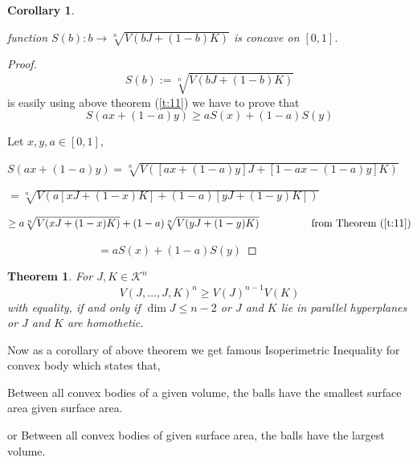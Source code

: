 \documentclass[oneside]{book}
\newtheorem{theorem}{Theorem}[section]
\newtheorem{corollary}{Corollary}[section]
\begin{document}
	\begin{corollary}
		\label{cor:2}
		
		function $ S(b):b\rightarrow \sqrt[n]{V(bJ+(1-b)K)}$  is concave on $[0,1] .$ 
	\end{corollary}
	\begin{proof}
		
		\[
		S(b):=\sqrt[n]{V(b J+(1-b) K)}
		\] 
		is  easily using above theorem (\ref{t:11})
		\hfill \break
		we have to prove that 
		$$ S(a x+(1-a) y) \geq a S(x)+(1-a) S(y) $$
		
		Let $x, y, a \in[0,1],$ 
		
		\hfill \break
		
		$  S(ax+(1-a)y)  =\sqrt[n]{V([ax+(1-a)y] J+[1-a x-(1-a) y] K)}$
		
		\hfill \break
		
		\quad \quad \quad \quad \quad \quad \quad \quad 
		$=\sqrt[n]{V(a[x J+(1-x) K]+(1-a)[y J+(1-y) K])}$
		
		\hfill \break
		
		\quad \quad \quad \quad \quad \quad \quad \quad   $
		\geq a \sqrt[n]{V(x J+(1-x) K)}+(1-a) \sqrt[n]{V(y J+(1-y) K)}
		\quad \quad \quad \quad \quad \text{from Theorem } (\ref{t:11})$
		
		\hfill \break
		
		$ \quad \quad \quad \quad \quad  \quad  \quad \quad = a S(x)+(1-a) S(y)$
	\end{proof}
	
	
	
	
	
	
	
	
	
	
	
	
	
	
	\begin{theorem}
		\label{t:12}
		For $J, K \in \mathcal{K}^{n}$
		\[
		V(J, \ldots, J, K)^{n} \geq V(J)^{n-1} V(K)
		\]
		with equality, if and only if $\operatorname{dim} J \leq n-2$ or $J$ and $K$ lie in parallel hyperplanes or $J$ and $K$ are homothetic.
		\\
	\end{theorem} 
	Now as a corollary of above theorem we get famous Isoperimetric Inequality for convex body 
	which states that, 
	
	\hfill \break
	
	Between all convex bodies of a given volume, the balls have the smallest surface area given surface area. 
	
	\quad\quad\quad\quad\quad\quad\quad\quad\quad\quad\quad\quad\quad\quad
	or 
	\hfill \break
	Between all convex bodies of given surface area, the balls have the largest volume.
	
\end{document}
